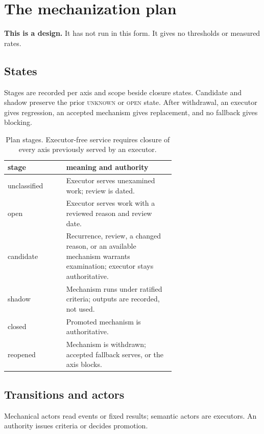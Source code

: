 \documentclass[11pt]{article}
\theoremstyle{definition}
\theoremstyle{remark}
\newcommand{\cstate}[1]{\textup{\textsc{#1}}}
\begin{document}
\section{The mechanization plan}\label{sec:protocol}
\textbf{This is a design.} It has not run in this form. It gives no thresholds or measured rates.

\subsection{States}\label{sec:planstates}
Stages are recorded per axis and scope beside closure states.
Candidate and shadow preserve the prior \cstate{unknown} or \cstate{open} state.
After withdrawal, an executor gives regression, an accepted mechanism gives replacement,
and no fallback gives blocking.

\begin{table}[ht]
\centering
\small
\begin{tabular}{lp{0.65\linewidth}}
\toprule
stage & meaning and authority \\
\midrule
unclassified & Executor serves unexamined work; review is dated. \\
open & Executor serves work with a reviewed reason and review date. \\
candidate & Recurrence, review, a changed reason, or an available mechanism warrants examination;
executor stays authoritative. \\
shadow & Mechanism runs under ratified criteria; outputs are recorded, not used. \\
closed & Promoted mechanism is authoritative. \\
reopened & Mechanism is withdrawn; accepted fallback serves, or the axis blocks. \\
\bottomrule
\end{tabular}
\caption{Plan stages. Executor-free service requires closure of every axis previously served by
an executor.}\label{tab:planstates}
\end{table}

\subsection{Transitions and actors}\label{sec:plantrans}
Mechanical actors read events or fixed results; semantic actors are executors.
An authority issues criteria or decides promotion.
\end{document}
